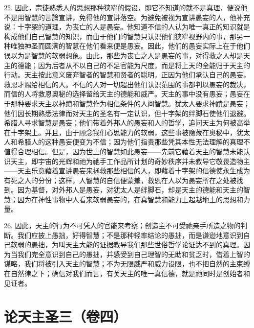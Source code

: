 25. 因此，宗徒熟悉人的思想那种狭窄的假设，即它不知道的就不是真理，便说他不是用智慧的言論宣讲，免得他的宣讲落空。为避免被视为宣讲愚妄的人，他补充说：十字架的道理，为丧亡的人是愚妄。他知道不信的人认为唯一真正的知识就是构成他们自己智慧的知识，而由于他们的智慧只认识他们狭窄视野内的事，那另一种唯独神圣而圆满的智慧在他们看来便是愚妄。因此，他们的愚妄实际上在于他们误以为是智慧的软弱想象。由此，那些为丧亡之人是愚妄的事，对得救之人却是天主的德能；因为后者从不以自己的不足官能为尺度，而是将上天的全能归于天主的行动。天主按此意义废弃智者的智慧和贤者的聪明，正因为他们承认自己的愚妄，救恩才赐给相信的人。不信的人对一切超出他们认识范围的事都判以愚妄的裁决，而信的人将救恩奥秘的选择留给天主的德能和威严。天主的事中没有愚妄；愚妄在于那种要求天主以神蹟和智慧作为相信条件的人间智慧。犹太人要求神蹟是愚妄；他们因长期熟悉法律而对天主的圣名有一定认识，但十字架的绊脚石使他们退避。希腊人寻求智慧是愚妄；他们带着外邦人的愚妄和人的哲学，追问天主为何被高举在十字架上。并且，由于顾念我们心思能力的软弱，这些事被隐藏在奥秘中，犹太人和希腊人的这种愚妄便变为不信；因为他们指责那些凭其本性无法理解的真理不值得合理相信。但是，因为世上的智慧如此愚妄——先前它藉着天主的智慧未能认识天主，即宇宙的光辉和祂为祂手工作品所计划的奇妙秩序并未教导它敬畏造物主——天主乐意藉着宣讲愚妄来拯救那些相信的人，即藉着十字架的信德使永生成为有死之人的分份；这样，人智慧的自信便蒙羞，救恩在人以为愚妄所在之处被找到。因为基督，对外邦人是愚妄，对犹太人是绊脚石，却是天主的德能和天主的智慧；因为在神性事物中人看来软弱愚妄的，在真智慧和能力上超越地上的思想和力量。\par

26. 因此，天主的行为不可凭人的官能来考察；创造主不可受祂亲手所造之物的判断。我们应披上愚拙，好得智慧；不是那种轻率结论的愚拙，而是谦逊地意识到自己软弱的愚拙，为叫天主大能的证据教导我们那些世俗哲学论证达不到的真理。因为当我们完全意识到自己的愚拙，并感受到自己理智的无助和贫乏时，借着上智的谋略，我们将被引入天主的智慧；不为无限威严和威力设限，也不把自然的主束缚在自然律之下；确信对我们而言，有关天主的唯一真信德，就是祂同时是创始者和见证者。\par



\section{论天主圣三（卷四）}

